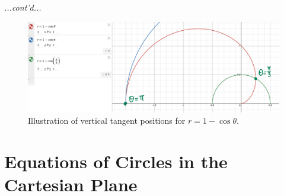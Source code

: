 \documentclass{article}
\begin{document}
\begin{examplebox}
    \textit{...cont'd...}
    \begin{figure}[H]
        \centering
        \includegraphics[width=1\textwidth]{demo for 1 - cos(theta).png}
        \caption{Illustration of vertical tangent positions for \( r = 1 - \cos\theta \).}
        \label{fig:vertical_tangents}
    \end{figure}
\end{examplebox}

\section*{Equations of Circles in the Cartesian Plane}
\end{document}
